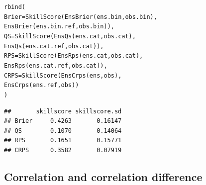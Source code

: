 \documentclass[article]{jss}\usepackage[]{graphicx}\usepackage[]{color}
\makeatletter
\newcommand{\hlstd}[1]{\textcolor[rgb]{0,0,0}{#1}}%
\newcommand{\hlkwc}[1]{\textcolor[rgb]{0,0.502,0.753}{#1}}%
\newcommand{\hlkwd}[1]{\textcolor[rgb]{0,0.267,0.4}{#1}}%
\newenvironment{kframe}{%
 \def\at@end@of@kframe{}%
 \ifinner\ifhmode%
  \def\at@end@of@kframe{\end{minipage}}%
  \begin{minipage}{\columnwidth}%
 \fi\fi%
 \def\FrameCommand##1{\hskip\@totalleftmargin \hskip-\fboxsep
 \colorbox{shadecolor}{##1}\hskip-\fboxsep
     \hskip-\linewidth \hskip-\@totalleftmargin \hskip\columnwidth}%
 \MakeFramed {\advance\hsize-\width
   \@totalleftmargin\z@ \linewidth\hsize
   \@setminipage}}%
 {\par\unskip\endMakeFramed%
 \at@end@of@kframe}
\newenvironment{knitrout}{}{} %
\makeatother
\begin{document}
\begin{knitrout}
\color{fgcolor}\begin{kframe}
\begin{alltt}
\hlkwd{rbind}\hlstd{(}
 \hlkwc{Brier} \hlstd{=} \hlkwd{SkillScore}\hlstd{(}\hlkwd{EnsBrier}\hlstd{(ens.bin, obs.bin),}
                    \hlkwd{EnsBrier}\hlstd{(ens.bin.ref, obs.bin)),}
 \hlkwc{QS}    \hlstd{=} \hlkwd{SkillScore}\hlstd{(}\hlkwd{EnsQs}\hlstd{(ens.cat, obs.cat),}
                    \hlkwd{EnsQs}\hlstd{(ens.cat.ref, obs.cat)),}
 \hlkwc{RPS}   \hlstd{=} \hlkwd{SkillScore}\hlstd{(}\hlkwd{EnsRps}\hlstd{(ens.cat, obs.cat),}
                    \hlkwd{EnsRps}\hlstd{(ens.cat.ref, obs.cat)),}
 \hlkwc{CRPS}  \hlstd{=} \hlkwd{SkillScore}\hlstd{(}\hlkwd{EnsCrps}\hlstd{(ens, obs),}
                    \hlkwd{EnsCrps}\hlstd{(ens.ref, obs))}
\hlstd{)}
\end{alltt}
\begin{verbatim}
##       skillscore skillscore.sd
## Brier     0.4263       0.16147
## QS        0.1070       0.14064
## RPS       0.1651       0.15771
## CRPS      0.3582       0.07919
\end{verbatim}
\end{kframe}
\end{knitrout}


\subsection{Correlation and correlation difference}
\end{document}
